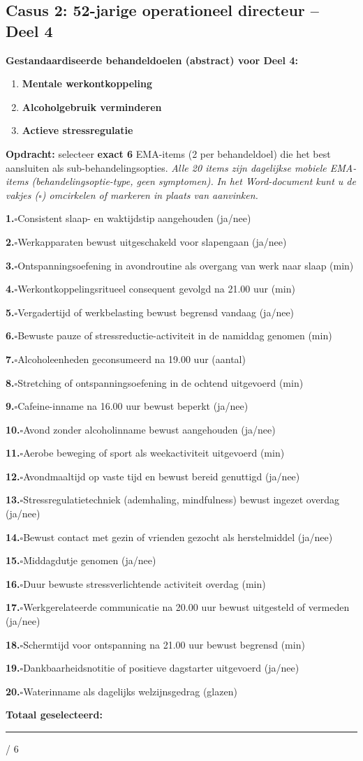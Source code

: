 \documentclass[11pt,a4paper]{article}
\newcommand{\checkitemBFS}[2]{%
\noindent\small\textbf{#1.}\hspace{0.45em}$\square$\hspace{0.4em}#2\par\vspace{0.20em}}
\begin{document}
\vspace{0.6em}
\newpage
\subsection*{Casus 2: 52-jarige operationeel directeur -- Deel 4}

\begin{contextbox}
\small\textbf{Gestandaardiseerde behandeldoelen (abstract) voor Deel 4:}
\begin{enumerate}[topsep=2pt,itemsep=1pt,label=\arabic*.]
\item \textbf{Mentale werkontkoppeling}
\item \textbf{Alcoholgebruik verminderen}
\item \textbf{Actieve stressregulatie}
\end{enumerate}
\end{contextbox}

\begin{responsebox}
\small\textbf{Opdracht:} selecteer \textbf{exact 6} EMA-items (2 per behandeldoel) die het best aansluiten als sub-behandelingsopties.
\textit{Alle 20 items zijn dagelijkse mobiele EMA-items (behandelingsoptie-type, geen symptomen).}
\textit{In het Word-document kunt u de vakjes ($\square$) omcirkelen of markeren in plaats van aanvinken.}

\checkitemBFS{1}{Consistent slaap- en waktijdstip aangehouden (ja/nee)}
\checkitemBFS{2}{Werkapparaten bewust uitgeschakeld voor slapengaan (ja/nee)}
\checkitemBFS{3}{Ontspanningsoefening in avondroutine als overgang van werk naar slaap (min)}
\checkitemBFS{4}{Werkontkoppelingsritueel consequent gevolgd na 21.00 uur (min)}
\checkitemBFS{5}{Vergadertijd of werkbelasting bewust begrensd vandaag (ja/nee)}
\checkitemBFS{6}{Bewuste pauze of stressreductie-activiteit in de namiddag genomen (min)}
\checkitemBFS{7}{Alcoholeenheden geconsumeerd na 19.00 uur (aantal)}
\checkitemBFS{8}{Stretching of ontspanningsoefening in de ochtend uitgevoerd (min)}
\checkitemBFS{9}{Cafeine-inname na 16.00 uur bewust beperkt (ja/nee)}
\checkitemBFS{10}{Avond zonder alcoholinname bewust aangehouden (ja/nee)}
\checkitemBFS{11}{Aerobe beweging of sport als weekactiviteit uitgevoerd (min)}
\checkitemBFS{12}{Avondmaaltijd op vaste tijd en bewust bereid genuttigd (ja/nee)}
\checkitemBFS{13}{Stressregulatietechniek (ademhaling, mindfulness) bewust ingezet overdag (ja/nee)}
\checkitemBFS{14}{Bewust contact met gezin of vrienden gezocht als herstelmiddel (ja/nee)}
\checkitemBFS{15}{Middagdutje genomen (ja/nee)}
\checkitemBFS{16}{Duur bewuste stressverlichtende activiteit overdag (min)}
\checkitemBFS{17}{Werkgerelateerde communicatie na 20.00 uur bewust uitgesteld of vermeden (ja/nee)}
\checkitemBFS{18}{Schermtijd voor ontspanning na 21.00 uur bewust begrensd (min)}
\checkitemBFS{19}{Dankbaarheidsnotitie of positieve dagstarter uitgevoerd (ja/nee)}
\checkitemBFS{20}{Waterinname als dagelijks welzijnsgedrag (glazen)}
\vspace{0.4em}
\noindent\textbf{Totaal geselecteerd:}\hspace{0.5em}\rule{1.2cm}{0.25pt}\hspace{0.2em}/ 6
\end{responsebox}
\end{document}
